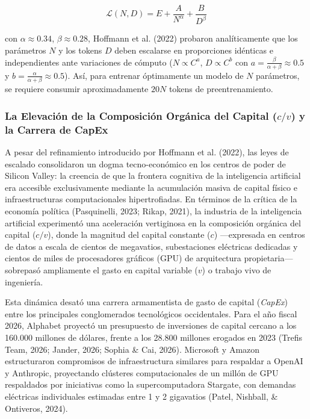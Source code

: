 \begin{equation}
\mathcal{L}(N, D) = E + \frac{A}{N^\alpha} + \frac{B}{D^\beta}
\end{equation}

con $\alpha \approx 0.34$, $\beta \approx 0.28$, Hoffmann et al. (2022) probaron analíticamente que los parámetros $N$ y los tokens $D$ deben escalarse en proporciones idénticas e independientes ante variaciones de cómputo ($N \propto C^a$, $D \propto C^b$ con $a = \frac{\beta}{\alpha+\beta} \approx 0.5$ y $b = \frac{\alpha}{\alpha+\beta} \approx 0.5$). Así, para entrenar óptimamente un modelo de $N$ parámetros, se requiere consumir aproximadamente $20N$ tokens de preentrenamiento.

\subsubsection{La Elevación de la Composición Orgánica del Capital ($c/v$) y la Carrera de CapEx}

A pesar del refinamiento introducido por Hoffmann et al. (2022), las leyes de escalado consolidaron un dogma tecno-económico en los centros de poder de Silicon Valley: la creencia de que la frontera cognitiva de la inteligencia artificial era accesible exclusivamente mediante la acumulación masiva de capital físico e infraestructuras computacionales hipertrofiadas. En términos de la crítica de la economía política (Pasquinelli, 2023; Rikap, 2021), la industria de la inteligencia artificial experimentó una aceleración vertiginosa en la composición orgánica del capital ($c/v$), donde la magnitud del capital constante ($c$) ---expresada en centros de datos a escala de cientos de megavatios, subestaciones eléctricas dedicadas y cientos de miles de procesadores gráficos (GPU) de arquitectura propietaria--- sobrepasó ampliamente el gasto en capital variable ($v$) o trabajo vivo de ingeniería.

Esta dinámica desató una carrera armamentista de gasto de capital (\textit{CapEx}) entre los principales conglomerados tecnológicos occidentales. Para el año fiscal 2026, Alphabet proyectó un presupuesto de inversiones de capital cercano a los 160.000 millones de dólares, frente a los 28.800 millones erogados en 2023 (Trefis Team, 2026; Jander, 2026; Sophia \& Cai, 2026). Microsoft y Amazon estructuraron compromisos de infraestructura similares para respaldar a OpenAI y Anthropic, proyectando clústeres computacionales de un millón de GPU respaldados por iniciativas como la supercomputadora Stargate, con demandas eléctricas individuales estimadas entre 1 y 2 gigavatios (Patel, Nishball, \& Ontiveros, 2024).

